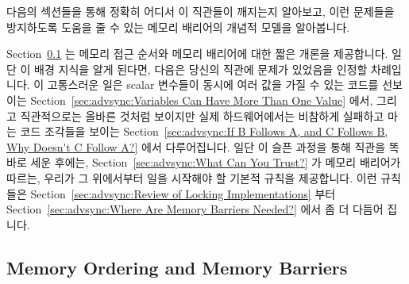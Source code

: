 다음의 섹션들을 통해 정확히 어디서 이 직관들이 깨지는지 알아보고, 이런 문제들을
방지하도록 도움을 줄 수 있는 메모리 배리어의 개념적 모델을 알아봅니다.

Section~\ref{sec:advsync:Memory Ordering and Memory Barriers} 는 메모리 접근
순서와 메모리 배리어에 대한 짧은 개론을 제공합니다.
일단 이 배경 지식을 알게 된다면, 다음은 당신의 직관에 문제가 있었음을 인정할
차례입니다.
이 고통스러운 일은
scalar 변수들이 동시에 여러 값을 가질 수 있는 코드를 선보이는
Section~\ref{sec:advsync:Variables Can Have More Than One Value} 에서, 그리고
직관적으로는 올바른 것처럼 보이지만 실제 하드웨어에서는 비참하게 실패하고
마는 코드 조각들을 보이는
Section~\ref{sec:advsync:If B Follows A, and C Follows B, Why Doesn't C Follow A?}
에서 다루어집니다.
일단 이 슬픈 과정을 통해 직관을 똑바로 세운 후에는,
Section~\ref{sec:advsync:What Can You Trust?} 가 메모리 배리어가 따르는, 우리가
그 위에서부터 일을 시작해야 할 기본적 규칙을 제공합니다.
이런 규칙들은
Section~\ref{sec:advsync:Review of Locking Implementations}
부터 Section~\ref{sec:advsync:Where Are Memory Barriers Needed?} 에서 좀 더
다듬어 집니다.

\subsection{Memory Ordering and Memory Barriers}
\label{sec:advsync:Memory Ordering and Memory Barriers}

